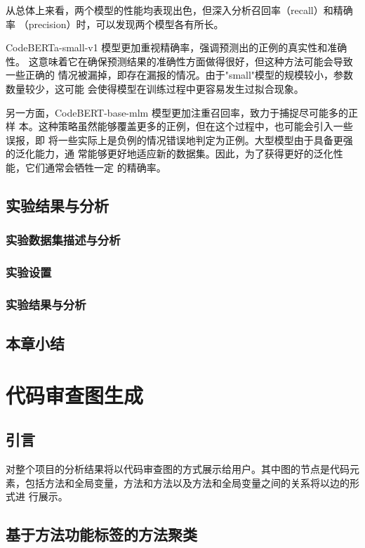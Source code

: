 从总体上来看，两个模型的性能均表现出色，但深入分析召回率（recall）和精确率
（precision）时，可以发现两个模型各有所长。

CodeBERTa-small-v1 模型更加重视精确率，强调预测出的正例的真实性和准确性。
这意味着它在确保预测结果的准确性方面做得很好，但这种方法可能会导致一些正确的
情况被漏掉，即存在漏报的情况。由于"small"模型的规模较小，参数数量较少，这可能
会使得模型在训练过程中更容易发生过拟合现象。

另一方面，CodeBERT-base-mlm 模型更加注重召回率，致力于捕捉尽可能多的正样
本。这种策略虽然能够覆盖更多的正例，但在这个过程中，也可能会引入一些误报，即
将一些实际上是负例的情况错误地判定为正例。大型模型由于具备更强的泛化能力，通
常能够更好地适应新的数据集。因此，为了获得更好的泛化性能，它们通常会牺牲一定
的精确率。

\section{实验结果与分析}

\subsection{实验数据集描述与分析}
\subsection{实验设置}
\subsection{实验结果与分析}

\section{本章小结}



\chapter{代码审查图生成}
\section{引言}
对整个项目的分析结果将以代码审查图的方式展示给用户。其中图的节点是代码元
素，包括方法和全局变量，方法和方法以及方法和全局变量之间的关系将以边的形式进
行展示。

\section{基于方法功能标签的方法聚类}
